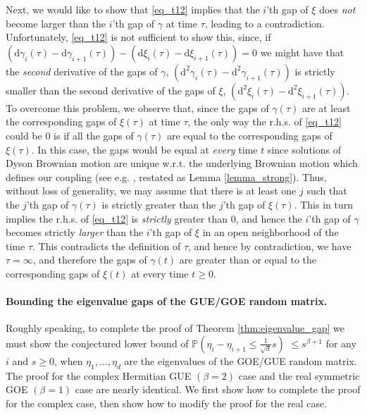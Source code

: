 \documentclass[11pt,letterpaper]{article}
\begin{document}
Next, we would like to show that \eqref{eq_t12} implies that the $i$'th gap of $\xi$ does {\em not} become larger than the $i$'th gap of $\gamma$ at time $\tau$, leading to a contradiction.
%
Unfortunately, \eqref{eq_t12} is not sufficient to show this, since, if $(\mathrm{d} \gamma_i(\tau) - \mathrm{d} \gamma_{i+1} (\tau)) -   (\mathrm{d} \xi_i(\tau) - \mathrm{d} \xi_{i+1} (\tau)) = 0$ we might have that the {\em second} derivative of the gaps of $\gamma$,  $(\mathrm{d}^2 \gamma_i(\tau) - \mathrm{d}^2 \gamma_{i+1} (\tau))$ is strictly smaller than the second derivative of the gaps of $\xi$,  $(\mathrm{d}^2 \xi_i(\tau) - \mathrm{d}^2 \xi_{i+1} (\tau))$. 
%
 To overcome this problem, we observe that, since 
 the gaps of $\gamma(\tau)$ are at least the corresponding gaps of $\xi(\tau)$ at time $\tau$, the only way the r.h.s. of \eqref{eq_t12} could be $0$ is if all the gaps of $\gamma(\tau)$ are equal to the corresponding gaps of $\xi(\tau)$. 
 In this case, the gaps would be equal at {\em every} time $t$ since solutions of Dyson Brownian motion are unique w.r.t. the underlying Brownian motion which defines our coupling  (see e.g. \cite{anderson2010introduction}, restated as Lemma \ref{lemma_strong}).
%
%
Thus, without loss of generality, we may assume that there is at least one $j$ such that the $j$'th gap of $\gamma(\tau)$ is strictly greater than the $j$'th gap of $\xi(\tau)$.
%
This in turn implies the r.h.s. of \eqref{eq_t12} is {\em strictly} greater than $0$, and hence the $i$'th gap of $\gamma$ becomes strictly {\em larger} than the $i$'th gap of $\xi$ in an open neighborhood of the time $\tau$.
%
This contradicts the definition of 
$\tau$, and hence by contradiction, we have $\tau = \infty$, and therefore the gaps of $\gamma(t)$ are greater than or equal to the corresponding gaps of $\xi(t)$ at every time $t \geq 0$.

\paragraph{Bounding the eigenvalue gaps of the GUE/GOE random matrix.}


%
Roughly speaking, to complete the proof of Theorem \ref{thm:eigenvalue_gap} we must show the conjectured lower bound of $\mathbb{P}\left(\eta_i - \eta_{i+1} \leq \frac{1}{\sqrt{d}} s\right)$ $\leq s^{\beta +1}$ for any $i$ and $s \geq 0$,  when $\eta_1,\ldots, \eta_d$ are the eigenvalues of the GOE/GUE random matrix.
%
The proof for the complex Hermitian GUE  $(\beta =2)$ case and the real symmetric GOE $(\beta = 1)$ case are nearly identical.
%
We first show how to complete the proof for the complex case, then show how to modify the proof for the real case.
\end{document}
